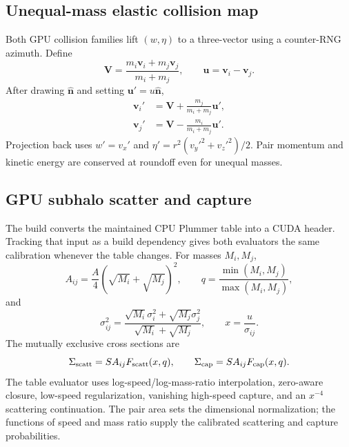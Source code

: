 \subsection{Unequal-mass elastic collision map}

Both GPU collision families lift \((w,\eta)\) to a three-vector using a
counter-RNG azimuth.  Define
\begin{equation}
 \bm V=\frac{m_i\bm v_i+m_j\bm v_j}{m_i+m_j},\qquad
 \bm u=\bm v_i-\bm v_j.
\end{equation}
After drawing \(\widehat{\bm n}\) and setting
\(\bm u'=u\widehat{\bm n}\),
\begin{align}
 \bm v_i'&=\bm V+\frac{m_j}{m_i+m_j}\bm u',\\
 \bm v_j'&=\bm V-\frac{m_i}{m_i+m_j}\bm u'.
\end{align}
Projection back uses \(w'=v_x'\) and
\(\eta'=r^2(v_y'^2+v_z'^2)/2\).  Pair momentum and kinetic energy are
conserved at roundoff even for unequal masses.

\subsection{GPU subhalo scatter and capture}

The build converts the maintained CPU Plummer table into a CUDA header.
Tracking that input as a build dependency gives both evaluators the same
calibration whenever the table changes.  For masses \(M_i,M_j\),
\begin{equation}
 A_{ij}=\frac{A}{4}(\sqrt{M_i}+\sqrt{M_j})^2,
 \qquad q=\frac{\min(M_i,M_j)}{\max(M_i,M_j)},
\end{equation}
and
\begin{equation}
 \sigma_{ij}^2=
 \frac{\sqrt{M_i}\sigma_i^2+\sqrt{M_j}\sigma_j^2}
 {\sqrt{M_i}+\sqrt{M_j}},
 \qquad x=\frac{u}{\sigma_{ij}}.
\end{equation}
The mutually exclusive cross sections are
\begin{equation}
 \Sigma_{\rm scatt}=SA_{ij}F_{\rm scatt}(x,q),\qquad
 \Sigma_{\rm cap}=SA_{ij}F_{\rm cap}(x,q).
\end{equation}
The table evaluator uses log-speed/log-mass-ratio interpolation, zero-aware
closure, low-speed regularization, vanishing high-speed capture, and an
\(x^{-4}\) scattering continuation. The pair area sets the dimensional
normalization; the functions of speed and mass ratio supply the calibrated
scattering and capture probabilities.

